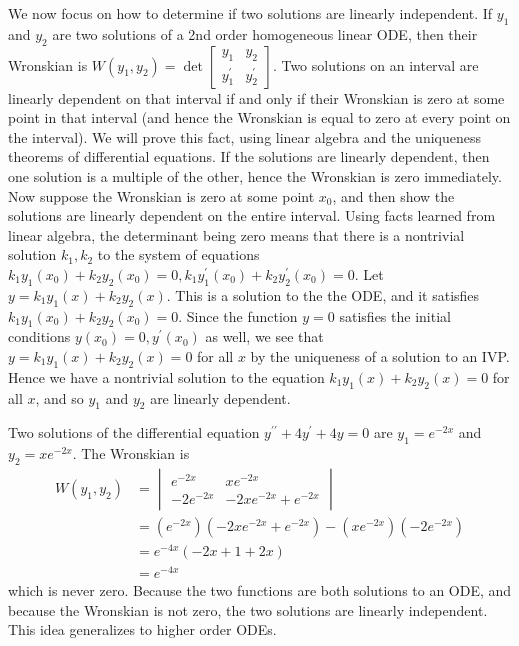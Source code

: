 We now focus on how to determine if two solutions are linearly independent.  If $y_1$ and $y_2$ are two solutions of a 2nd order homogeneous linear ODE, then their Wronskian is $W(y_1,y_2) = \det\begin{bmatrix}y_1&y_2\\y_1^\prime&y_2^\prime \end{bmatrix}$. Two solutions on an interval are linearly dependent on that interval if and only if their Wronskian is zero at some point in that interval (and hence the Wronskian is equal to zero at every point on the interval).   We will prove this fact, using linear algebra and the uniqueness theorems of differential equations. If the solutions are linearly dependent, then one solution is a multiple of the other, hence the Wronskian is zero immediately.  Now suppose the Wronskian is zero at some point $x_0$, and then show the solutions are linearly dependent on the entire interval. Using facts learned from linear algebra, the determinant being zero means that there is a nontrivial solution $k_1,k_2$ to the system of equations $k_1y_1(x_0)+k_2y_2(x_0)=0, k_1y_1^\prime(x_0)+k_2y_2^\prime(x_0)=0$. Let $y= k_1y_1(x)+k_2y_2(x)$. This is a solution to the the ODE, and it satisfies  $k_1y_1(x_0)+k_2y_2(x_0)=0$.  Since the function $y=0$ satisfies the initial conditions $y(x_0)=0, y^\prime(x_0)$ as well, we see that $y= k_1y_1(x)+k_2y_2(x)=0$ for all $x$ by the uniqueness of a solution to an IVP.  Hence we have a nontrivial solution to the equation $k_1y_1(x)+k_2y_2(x)=0$ for all $x$, and so $y_1$ and $y_2$ are linearly dependent.

\begin{example}
Two solutions of the differential equation $y^{\prime\prime}+4y^\prime+4y=0$ are $y_1=e^{-2x}$ and $y_2=xe^{-2x}$.  The Wronskian is 
\begin{align*}
W(y_1,y_2) 
&= \begin{vmatrix}e^{-2x}&xe^{-2x}\\
-2e^{-2x}&-2xe^{-2x}+e^{-2x} \end{vmatrix} \\
&= (e^{-2x})(-2xe^{-2x}+e^{-2x}) - (xe^{-2x})(-2e^{-2x})\\
&= e^{-4x}(-2x+1+2x) \\
&= e^{-4x}
\end{align*} 
which is never zero. Because the two functions are both solutions to an ODE, and because the Wronskian is not zero, the two solutions are linearly independent. This idea generalizes to higher order ODEs.
\end{example}
